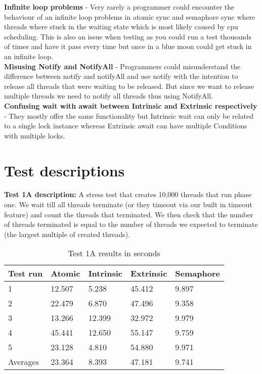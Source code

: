 \documentclass[11pt]{article}
\begin{document}
\textbf{Infinite loop problems} -  Very rarely a programmer could encounter the behaviour of an infinite loop problems in atomic sync and semaphore sync where threads where stuck in the waiting state which is most likely caused by cpu scheduling. This is also an issue when testing as you could run a test thousands of times and have it pass every time but once in a blue moon could get stuck in an infinite loop. \\


\textbf{Misusing Notify and NotifyAll} - Programmers could misunderstand the difference between notify and notifyAll and use notify with the intention to release all threads that were waiting to be released. But since we want to release multiple threads we need to notify all threads thus using NotifyAll. \\


\textbf{Confusing wait with await between Intrinsic and Extrinsic respectively} - They mostly offer the same functionality but Intrinsic wait can only be related to a single lock instance whereas Extrinsic await can have multiple Conditions with multiple locks.

\newpage
\appendix
\section{Test descriptions}
\textbf{Test 1A description:} A stress test that creates 10,000 threads that run phase one. We wait till all threads terminate (or they timeout via our built in timeout feature) and count the threads that terminated. We then check that the number of threads terminated is equal to the number of threads we expected to terminate (the largest multiple of created threads).\\



\begin{table}[H]
\centering
\caption{Test 1A results in seconds}
\label{tab:my-table}
\begin{tabular}{|l|l|l|l|l|}
\hline
Test run & Atomic & Intrinsic & Extrinsic & Semaphore \\ \hline
1        & 12.507 & 5.238     & 45.412    & 9.897     \\ \hline
2        & 22.479 & 6.870     & 47.496    & 9.358     \\ \hline
3        & 13.266 & 12.399    & 32.972    & 9.979     \\ \hline
4        & 45.441 & 12.650    & 55.147    & 9.759     \\ \hline
5        & 23.128 & 4.810     & 54.880    & 9.971     \\ \hline
Averages & 23.364 & 8.393     & 47.181    & 9.741     \\ \hline
\end{tabular}
\end{table}
\end{document}
